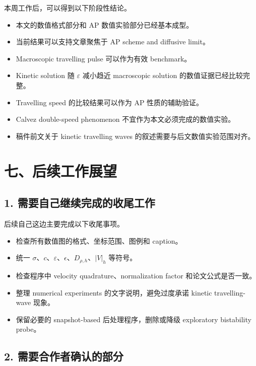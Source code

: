 \documentclass[11pt]{ctexart}
\begin{document}
本周工作后，可以得到以下阶段性结论。

\begin{itemize}[leftmargin=2em]
    \item 本文的数值格式部分和 AP 数值实验部分已经基本成型。
    \item 当前结果可以支持文章聚焦于 AP scheme and diffusive limit。
    \item Macroscopic travelling pulse 可以作为有效 benchmark。
    \item Kinetic solution 随 \(\varepsilon\) 减小趋近 macroscopic solution 的数值证据已经比较完整。
    \item Travelling speed 的比较结果可以作为 AP 性质的辅助验证。
    \item Calvez double-speed phenomenon 不宜作为本文必须完成的数值实验。
    \item 稿件前文关于 kinetic travelling waves 的叙述需要与后文数值实验范围对齐。
\end{itemize}

\section*{七、后续工作展望}

\subsection*{1. 需要自己继续完成的收尾工作}

后续自己这边主要完成以下收尾事项。

\begin{itemize}[leftmargin=2em]
    \item 检查所有数值图的格式、坐标范围、图例和 caption。
    \item 统一 \(\sigma\)、\(c\)、\(\varepsilon\)、\(\epsilon\)、\(D_{\rho,h}\)、\(|V|_h\) 等符号。
    \item 检查程序中 velocity quadrature、normalization factor 和论文公式是否一致。
    \item 整理 numerical experiments 的文字说明，避免过度承诺 kinetic travelling-wave 现象。
    \item 保留必要的 snapshot-based 后处理程序，删除或降级 exploratory bistability probe。
\end{itemize}

\subsection*{2. 需要合作者确认的部分}
\end{document}
